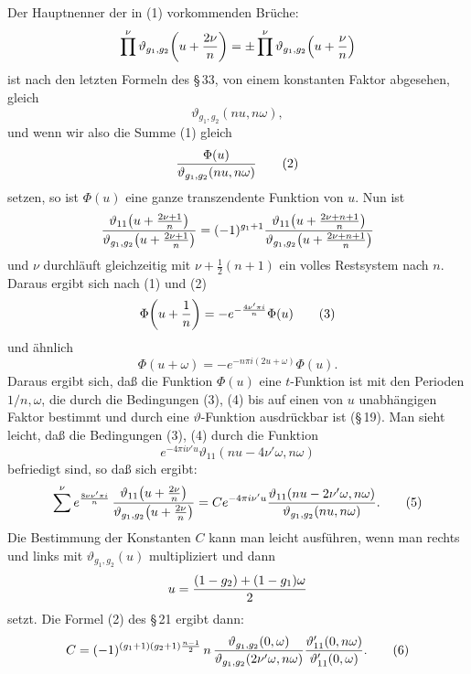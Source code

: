 \documentclass[11pt]{article}
\begin{document}
Der Hauptnenner der in (1) vorkommenden Brüche:
\[
\prod^\nu \vartheta_{g_1,g_2}\!\left(u+{2\nu\over n}\right)
=\pm\prod^\nu\vartheta_{g_1,g_2}\!\left(u+{\nu\over n}\right)
\]
ist nach den letzten Formeln des \S\,33, von einem konstanten Faktor abgesehen, gleich
\[
\vartheta_{g_1,g_2}(nu,n\omega),
\]
und wenn wir also die Summe (1) gleich
\begin{equation}
{\Phi(u)\over\vartheta_{g_1,g_2}(nu,n\omega)}
\tag{2}
\end{equation}
setzen, so ist $\Phi(u)$ eine ganze transzendente Funktion von $u$. Nun ist
\[
{\vartheta_{11}\!\left(u+{2\nu+1\over n}\right)\over
 \vartheta_{g_1,g_2}\!\left(u+{2\nu+1\over n}\right)}
=(-1)^{g_1+1}
{\vartheta_{11}\!\left(u+{2\nu+n+1\over n}\right)\over
 \vartheta_{g_1,g_2}\!\left(u+{2\nu+n+1\over n}\right)}
\]
und $\nu$ durchläuft gleichzeitig mit $\nu+\frac12(n+1)$ ein volles Restsystem nach $n$.
Daraus ergibt sich nach (1) und (2)
\begin{equation}
\Phi\!\left(u+{1\over n}\right)=-e^{-\frac{4\nu'\pi i}{n}}\Phi(u)
\tag{3}
\end{equation}
und ähnlich
\begin{equation}
\Phi(u+\omega)=-e^{-n\pi i(2u+\omega)}\Phi(u).
\tag{4}
\end{equation}
Daraus ergibt sich, daß die Funktion $\Phi(u)$ eine $t$-Funktion ist mit den Perioden
$1/n,\omega$, die durch die Bedingungen (3), (4) bis auf einen von $u$ unabhängigen
Faktor bestimmt und durch eine $\vartheta$-Funktion ausdrückbar ist (\S\,19). Man sieht
leicht, daß die Bedingungen (3), (4) durch die Funktion
\[
e^{-4\pi i\nu'u}\vartheta_{11}(nu-4\nu'\omega,n\omega)
\]
befriedigt sind, so daß sich ergibt:
\begin{equation}
\sum^\nu e^{\frac{8\nu\nu'\pi i}{n}}\,
{\vartheta_{11}\!\left(u+{2\nu\over n}\right)\over
 \vartheta_{g_1,g_2}\!\left(u+{2\nu\over n}\right)}
=
Ce^{-4\pi i\nu'u}
{\vartheta_{11}(nu-2\nu'\omega,n\omega)\over
 \vartheta_{g_1,g_2}(nu,n\omega)}.
\tag{5}
\end{equation}
Die Bestimmung der Konstanten $C$ kann man leicht ausführen, wenn man rechts und links
mit $\vartheta_{g_1,g_2}(u)$ multipliziert und dann
\[
u={(1-g_2)+(1-g_1)\omega\over2}
\]
setzt. Die Formel (2) des \S\,21 ergibt dann:
\begin{equation}
C=(-1)^{(g_1+1)(g_2+1)\frac{n-1}{2}}\,
n\,{\vartheta_{g_1,g_2}(0,\omega)\over\vartheta_{g_1,g_2}(2\nu'\omega,n\omega)}
{\vartheta'_{11}(0,n\omega)\over\vartheta'_{11}(0,\omega)}.
\tag{6}
\end{equation}
\end{document}
